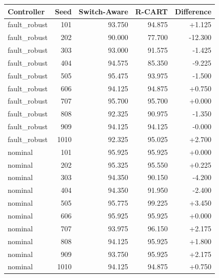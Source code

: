 \begin{tabular}{lrrrr}
\toprule
Controller & Seed & Switch-Aware & R-CART & Difference \\
\midrule
fault\_robust & 101 & 93.750 & 94.875 & +1.125 \\
fault\_robust & 202 & 90.000 & 77.700 & -12.300 \\
fault\_robust & 303 & 93.000 & 91.575 & -1.425 \\
fault\_robust & 404 & 94.575 & 85.350 & -9.225 \\
fault\_robust & 505 & 95.475 & 93.975 & -1.500 \\
fault\_robust & 606 & 94.125 & 94.875 & +0.750 \\
fault\_robust & 707 & 95.700 & 95.700 & +0.000 \\
fault\_robust & 808 & 92.325 & 90.975 & -1.350 \\
fault\_robust & 909 & 94.125 & 94.125 & -0.000 \\
fault\_robust & 1010 & 92.325 & 95.025 & +2.700 \\
nominal & 101 & 95.925 & 95.925 & +0.000 \\
nominal & 202 & 95.325 & 95.550 & +0.225 \\
nominal & 303 & 94.350 & 90.150 & -4.200 \\
nominal & 404 & 94.350 & 91.950 & -2.400 \\
nominal & 505 & 95.775 & 99.225 & +3.450 \\
nominal & 606 & 95.925 & 95.925 & +0.000 \\
nominal & 707 & 93.975 & 96.150 & +2.175 \\
nominal & 808 & 94.125 & 95.925 & +1.800 \\
nominal & 909 & 93.750 & 95.925 & +2.175 \\
nominal & 1010 & 94.125 & 94.875 & +0.750 \\
\bottomrule
\end{tabular}
